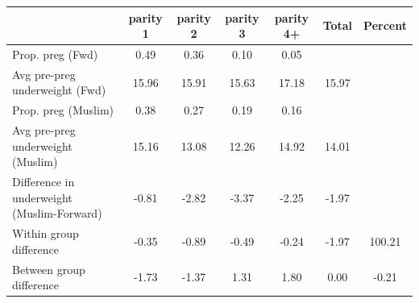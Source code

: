 \begin{tabular}{l*{6}{c}}
\toprule
            &\multicolumn{1}{c}{parity 1}&\multicolumn{1}{c}{parity 2}&\multicolumn{1}{c}{parity 3}&\multicolumn{1}{c}{parity 4+}&\multicolumn{1}{c}{Total}&\multicolumn{1}{c}{Percent}\\
\midrule
\midrule
Prop. preg (Fwd)&        0.49&        0.36&        0.10&        0.05&            &            \\
Avg pre-preg underweight (Fwd)&       15.96&       15.91&       15.63&       17.18&       15.97&            \\
Prop. preg (Muslim)&        0.38&        0.27&        0.19&        0.16&            &            \\
Avg pre-preg underweight (Muslim)&       15.16&       13.08&       12.26&       14.92&       14.01&            \\
Difference in underweight (Muslim-Forward)&       -0.81&       -2.82&       -3.37&       -2.25&       -1.97&            \\
Within group difference&       -0.35&       -0.89&       -0.49&       -0.24&       -1.97&      100.21\\
Between group difference&       -1.73&       -1.37&        1.31&        1.80&        0.00&       -0.21\\
\bottomrule
\end{tabular}
